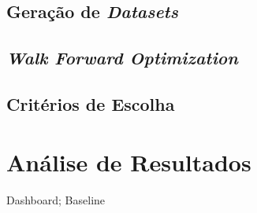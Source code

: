\subsection{Geração de \textit{Datasets}}
\paragraph{}

\subsection{\textit{Walk Forward Optimization}}
\paragraph{}

\subsection{Critérios de Escolha}
\paragraph{}


\section{Análise de Resultados}
\paragraph{} Dashboard; Baseline